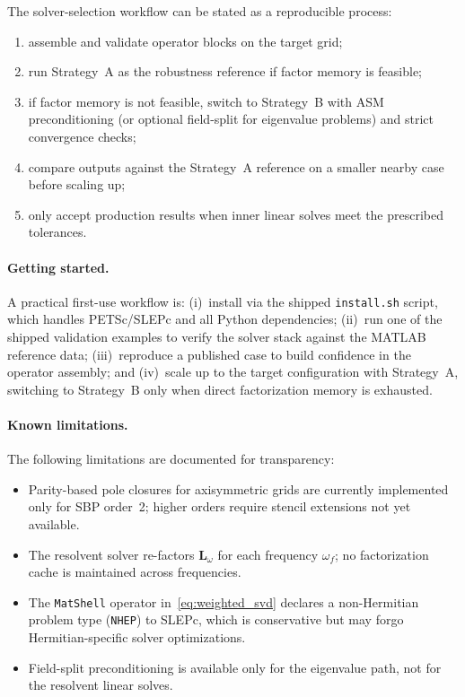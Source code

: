 \documentclass[11pt]{article}
\newcommand{\bL}{\mathbf{L}}
\begin{document}
The solver-selection workflow can be stated as a reproducible process:
\begin{enumerate}
\item assemble and validate operator blocks on the target grid;
\item run Strategy~A as the robustness reference if factor memory is feasible;
\item if factor memory is not feasible, switch to Strategy~B with ASM preconditioning (or optional field-split for eigenvalue problems) and strict convergence checks;
\item compare outputs against the Strategy~A reference on a smaller nearby case before scaling up;
\item only accept production results when inner linear solves meet the prescribed tolerances.
\end{enumerate}

\paragraph{Getting started.}
A practical first-use workflow is: (i)~install via the shipped \texttt{install.sh} script, which handles PETSc/SLEPc and all Python dependencies; (ii)~run one of the shipped validation examples to verify the solver stack against the MATLAB reference data; (iii)~reproduce a published case to build confidence in the operator assembly; and (iv)~scale up to the target configuration with Strategy~A, switching to Strategy~B only when direct factorization memory is exhausted.

\paragraph{Known limitations.}
The following limitations are documented for transparency:
\begin{itemize}[nosep]
  \item Parity-based pole closures for axisymmetric grids are currently implemented only for SBP order~2; higher orders require stencil extensions not yet available.
  \item The resolvent solver re-factors $\bL_\omega$ for each frequency $\omega_f$; no factorization cache is maintained across frequencies.
  \item The \texttt{MatShell} operator in~\eqref{eq:weighted_svd} declares a non-Hermitian problem type (\texttt{NHEP}) to SLEPc, which is conservative but may forgo Hermitian-specific solver optimizations.
  \item Field-split preconditioning is available only for the eigenvalue path, not for the resolvent linear solves.
\end{itemize}
\end{document}
